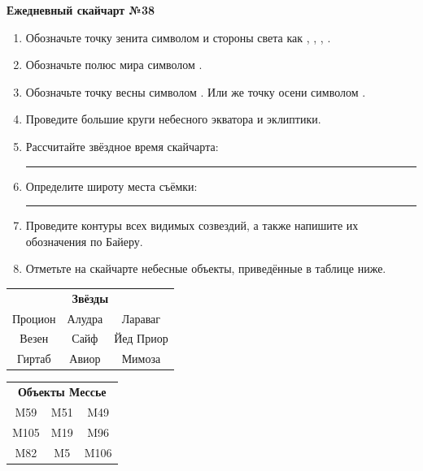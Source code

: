 \documentclass{./SAS-class-skygen}
\begin{document}
    
    
    
	\begin{center}
		\large\textbf{Ежедневный скайчарт №38}
	\end{center}

	\begin{enumerate}
		\item Обозначьте точку зенита символом  и стороны света как , , , .
		\item Обозначьте полюс мира символом .
		\item Обозначьте точку весны символом \Aries. Или же точку осени символом \Libra.
		\item Проведите большие круги небесного экватора и эклиптики.
		\item Рассчитайте звёздное время скайчарта: \rule{2cm}{0.4pt}
		\item Определите широту места съёмки: \rule{2cm}{0.4pt}
		\item Проведите контуры всех видимых созвездий, а также напишите их обозначения по Байеру.
		\item Отметьте на скайчарте небесные объекты, приведённые в таблице ниже.
	\end{enumerate}
	
    \vspace{0.5cm}

    \begin{table}[h!]
    \centering
    \begin{tabular}{ccc}
    \multicolumn{3}{c}{\textbf{Звёзды}} \\ Процион & Алудра & Лараваг \\
Везен & Сайф & Йед Приор \\
Гиртаб & Авиор & Мимоза \\

\end{tabular}
    \hfill
    \begin{tabular}{ccc}
    \multicolumn{3}{c}{\textbf{Объекты Мессье}} \\ M59 & M51 & M49 \\
M105 & M19 & M96 \\
M82 & M5 & M106 \\

\end{tabular}
    \end{table}
	
\end{document}
